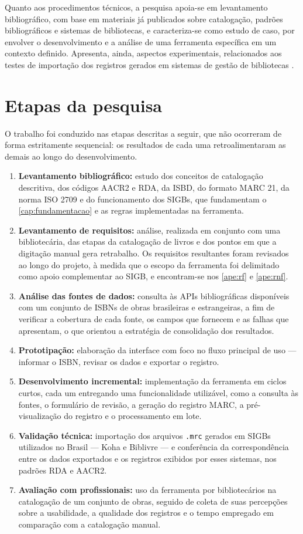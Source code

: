 Quanto aos procedimentos técnicos, a pesquisa apoia-se em levantamento bibliográfico, com base em materiais já publicados sobre catalogação, padrões bibliográficos e sistemas de bibliotecas, e caracteriza-se como estudo de caso, por envolver o desenvolvimento e a análise de uma ferramenta específica em um contexto definido. Apresenta, ainda, aspectos experimentais, relacionados aos testes de importação dos registros gerados em sistemas de gestão de bibliotecas \cite{gil2008}.

\section{Etapas da pesquisa}
\label{sec:etapas}

O trabalho foi conduzido nas etapas descritas a seguir, que não ocorreram de forma estritamente sequencial: os resultados de cada uma retroalimentaram as demais ao longo do desenvolvimento.

\begin{enumerate}
    \item \textbf{Levantamento bibliográfico:} estudo dos conceitos de catalogação descritiva, dos códigos AACR2 e RDA, da ISBD, do formato MARC 21, da norma ISO 2709 e do funcionamento dos SIGBs, que fundamentam o \autoref{cap:fundamentacao} e as regras implementadas na ferramenta.
    \item \textbf{Levantamento de requisitos:} análise, realizada em conjunto com uma bibliotecária, das etapas da catalogação de livros e dos pontos em que a digitação manual gera retrabalho. Os requisitos resultantes foram revisados ao longo do projeto, à medida que o escopo da ferramenta foi delimitado como apoio complementar ao SIGB, e encontram-se nos \autoref{ape:rf} e \autoref{ape:rnf}.
    \item \textbf{Análise das fontes de dados:} consulta às APIs bibliográficas disponíveis com um conjunto de ISBNs de obras brasileiras e estrangeiras, a fim de verificar a cobertura de cada fonte, os campos que fornecem e as falhas que apresentam, o que orientou a estratégia de consolidação dos resultados.
    \item \textbf{Prototipação:} elaboração da interface com foco no fluxo principal de uso --- informar o ISBN, revisar os dados e exportar o registro.
    \item \textbf{Desenvolvimento incremental:} implementação da ferramenta em ciclos curtos, cada um entregando uma funcionalidade utilizável, como a consulta às fontes, o formulário de revisão, a geração do registro MARC, a pré-visualização do registro e o processamento em lote.
    \item \textbf{Validação técnica:} importação dos arquivos \texttt{.mrc} gerados em SIGBs utilizados no Brasil --- Koha e Biblivre --- e conferência da correspondência entre os dados exportados e os registros exibidos por esses sistemas, nos padrões RDA e AACR2.
    \item \textbf{Avaliação com profissionais:} uso da ferramenta por bibliotecários na catalogação de um conjunto de obras, seguido de coleta de suas percepções sobre a usabilidade, a qualidade dos registros e o tempo empregado em comparação com a catalogação manual.
\end{enumerate}

